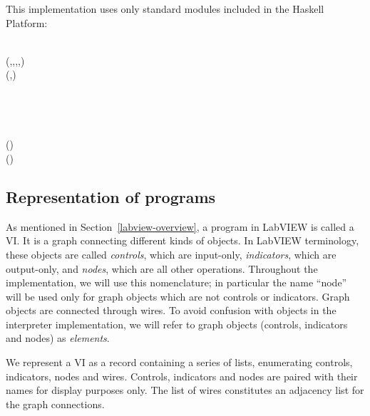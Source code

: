 
This implementation uses only standard modules included in the Haskell Platform:

\begin{hscode}\SaveRestoreHook
{}%
%
\>[B]{}\;\;\<[E]%
\\[\blanklineskip]%
\>[B]{}\;\;(,,,,){}\<[E]%
\\
\>[B]{}\;\;\;\;\;(,){}\<[E]%
\\
\>[B]{}\;\<[E]%
\\
\>[B]{}\;\<[E]%
\\
\>[B]{}\;\<[E]%
\\
\>[B]{}\;\<[E]%
\\
\>[B]{}\;\;(){}\<[E]%
\\
\>[B]{}\;\;(){}\<[E]%
\ColumnHook
\end{hscode}\resethooks

\subsection{Representation of programs}

As mentioned in Section~\ref{labview-overview}, a program in LabVIEW is called a VI.
It is a graph connecting different kinds of objects. In LabVIEW terminology, these objects
are called \emph{controls}, which are input-only, \emph{indicators}, which are
output-only, and \emph{nodes}, which are all other operations. Throughout the
implementation, we will use this nomenclature; in particular the name ``node''
will be used only for graph objects which are not controls or indicators.
Graph objects are connected through wires. To avoid confusion with objects
in the interpreter implementation, we will refer to graph objects (controls,
indicators and nodes) as \emph{elements}.

We represent a VI as a record containing a series of lists, enumerating
controls, indicators, nodes and wires. Controls, indicators and nodes are
paired with their names for display purposes only. The list of wires
constitutes an adjacency list for the graph connections.

